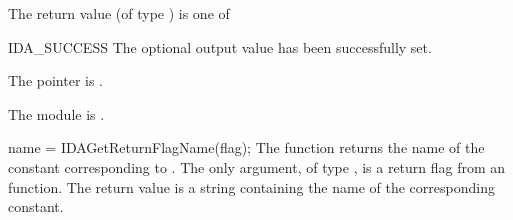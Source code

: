 {{\begin{args}[nncfails]
  \end{args}
}
{
  The return value  (of type ) is one of
  \begin{args}
  \item[IDA\_SUCCESS]
    The optional output value has been successfully set.
  \item[\Id{IDA\_MEM\_NULL}]
    The  pointer is .
  \item[\Id{IDA\_MEM\_FAIL}]
    The {\sunnonlinsol} module is .
  \end{args}
}
{}
{
  name = IDAGetReturnFlagName(flag);
}
{
  The function  returns the
  name of the {\idas} constant corresponding to .
}
{
  The only argument, of type , is a return flag from an {\idas} function.
}
{
  The return value is a string containing the name of the corresponding constant.
}
{}
}
